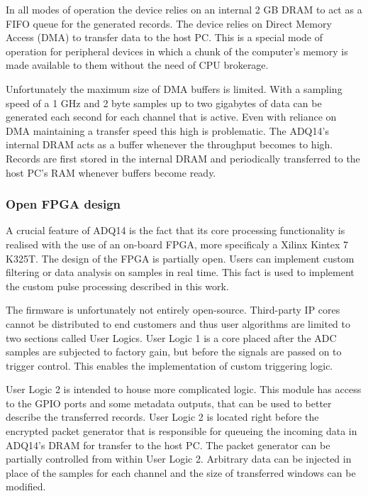 In all modes of operation the device relies on an internal 2 GB DRAM
to act as a FIFO queue for the generated records.
The device relies on Direct Memory Access (DMA) to transfer
data to the host PC. This is a special mode of operation for 
peripheral devices in which a chunk of the computer's memory is
made available to them without the need of CPU brokerage.


Unfortunately the maximum size of DMA buffers is limited. 
With a sampling speed of a 1 GHz and 2 byte samples up 
to two gigabytes of data can be generated each second for each
channel that is active. Even with reliance on DMA maintaining 
a transfer speed this high is problematic. The ADQ14's internal DRAM
acts as a buffer whenever the throughput becomes to high.
Records are first stored in the internal DRAM and periodically
transferred to the host PC's RAM whenever buffers become ready.

\subsubsection{Open FPGA design}

A crucial feature of ADQ14 is the fact that its core processing
functionality is realised with the use of an on-board FPGA,
more specificaly a Xilinx Kintex 7 K325T. The design of the FPGA
is partially open. Users can implement custom
filtering or data analysis on samples in real time.
This fact is used to implement the custom pulse processing described in this work.


The firmware is unfortunately not entirely open-source.
Third-party IP cores cannot be distributed to end customers 
and thus user algorithms are limited to two sections called User Logics.
User Logic 1 is a core placed after the ADC samples are subjected to factory
gain, but before the signals are passed on to trigger control.
This enables the implementation of custom triggering logic.


User Logic 2 is intended to house more complicated logic.
This module has access to the GPIO ports and some metadata
outputs, that can be used to better describe the transferred records.
User Logic 2 is located right before the encrypted packet generator
that is responsible for queueing the incoming data in ADQ14's DRAM 
for transfer to the host PC. The packet generator can be partially
controlled from within User Logic 2. Arbitrary data can be injected
in place of the samples for each channel and the size of transferred windows 
can be modified.

